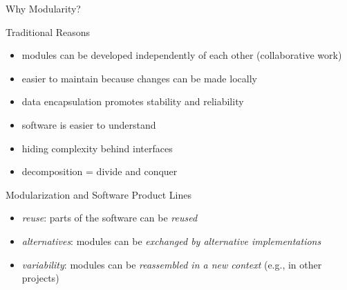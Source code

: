 \begin{frame}{Why Modularity?} %
	\begin{mycolumns}[widths={45,55},animation=none]
		\begin{note}{Traditional Reasons}
			\begin{itemize}
				\item modules can be developed independently of each other (collaborative work)
				\item easier to maintain because changes can be made locally
				\item data encapsulation promotes stability and reliability
				\item software is easier to understand
				\item hiding complexity behind interfaces
				\item decomposition = divide and conquer
			\end{itemize}						
		\end{note}
		\pause
	\mynextcolumn
		\begin{note}{Modularization and Software Product Lines}
			\begin{itemize}
				\item \emph{reuse}: parts of the software can be {\em reused}
				\item \emph{alternatives}: modules can be {\em exchanged by alternative implementations}
				\item \emph{variability}: modules can be {\em reassembled in a new context} (e.g., in other projects)
			\end{itemize}
		\end{note}
		\begin{exampletight}{}
		\end{exampletight}
	\end{mycolumns}	
\end{frame}

